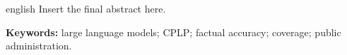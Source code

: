 \begin{resumo}[Abstract]
\begin{otherlanguage*}{english}
\noindent
Insert the final abstract here.

\vspace{\onelineskip}
\noindent
\textbf{Keywords:} large language models; CPLP; factual accuracy; coverage; public administration.
\end{otherlanguage*}
\end{resumo}
